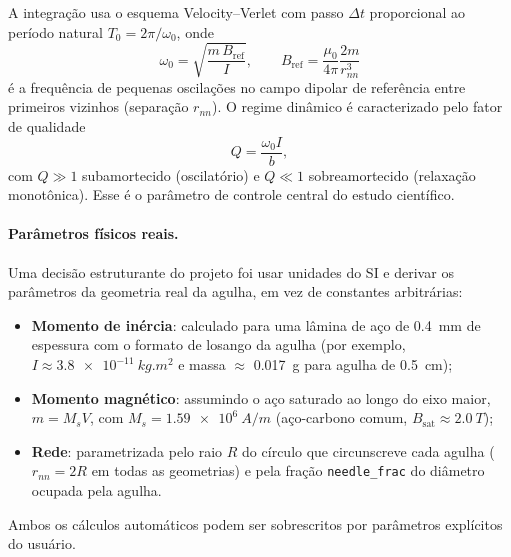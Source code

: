 \documentclass[11pt,a4paper]{article}
\newcommand{\code}[1]{\texttt{#1}}
\begin{document}
A integração usa o esquema Velocity--Verlet com passo $\Delta t$
proporcional ao período natural $T_0 = 2\pi/\omega_0$, onde
\begin{equation}
\omega_0 = \sqrt{\frac{m\,B_{\mathrm{ref}}}{I}},
\qquad
B_{\mathrm{ref}} = \frac{\mu_0}{4\pi}\frac{2m}{r_{nn}^{3}}
\end{equation}
é a frequência de pequenas oscilações no campo dipolar de referência
entre primeiros vizinhos (separação $r_{nn}$). O regime dinâmico é
caracterizado pelo fator de qualidade
\begin{equation}
Q = \frac{\omega_0 I}{b},
\end{equation}
com $Q \gg 1$ subamortecido (oscilatório) e $Q \ll 1$ sobreamortecido
(relaxação monotônica). Esse é o parâmetro de controle central do estudo
científico.

\paragraph{Parâmetros físicos reais.}
Uma decisão estruturante do projeto foi usar unidades do SI e derivar os
parâmetros da geometria real da agulha, em vez de constantes arbitrárias:
\begin{itemize}
\item \textbf{Momento de inércia}: calculado para uma lâmina de aço de
\SI{0.4}{mm} de espessura com o formato de losango da agulha (por
exemplo, $I \approx \SI{3.8e-11}{kg.m^2}$ e massa $\approx$
\SI{0.017}{g} para agulha de \SI{0.5}{cm});
\item \textbf{Momento magnético}: assumindo o aço saturado ao longo do
eixo maior, $m = M_s V$, com $M_s = \SI{1.59e6}{A/m}$ (aço-carbono
comum, $B_{\mathrm{sat}} \approx \SI{2.0}{T}$);
\item \textbf{Rede}: parametrizada pelo raio $R$ do círculo que
circunscreve cada agulha ($r_{nn} = 2R$ em todas as geometrias) e pela
fração \code{needle\_frac} do diâmetro ocupada pela agulha.
\end{itemize}
Ambos os cálculos automáticos podem ser sobrescritos por parâmetros
explícitos do usuário.
\end{document}
